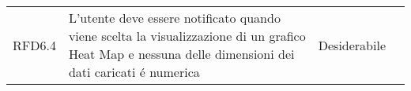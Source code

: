 \begin{longtable}[H]{|>{\raggedright\arraybackslash}p{20mm} | p{90mm} | p{22mm} | p{30mm} |}
    RFD6.4
        & L'utente deve essere notificato quando viene scelta la visualizzazione di un grafico Heat Map e nessuna delle dimensioni dei dati caricati é numerica
        & Desiderabile
        & \\
    
\end{longtable}
